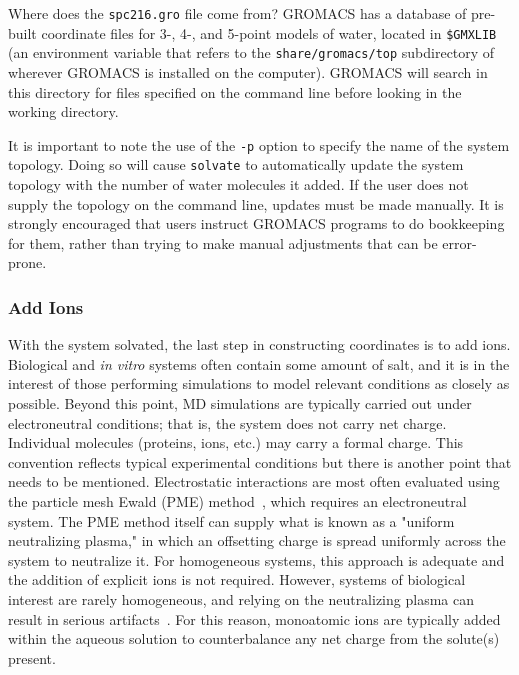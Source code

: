 \documentclass[9pt,tutorial]{livecoms}
\begin{document}
Where does the \texttt{spc216.gro} file come from? GROMACS has a database of pre-built coordinate files for 3-, 4-, and 5-point models of water, located in \texttt{\$GMXLIB} (an environment variable that refers to the \texttt{share/gromacs/top} subdirectory of wherever GROMACS is installed on the computer). GROMACS will search in this directory for files specified on the command line before looking in the working directory.

It is important to note the use of the \texttt{-p} option to specify the name of the system topology. Doing so will cause \texttt{solvate} to automatically update the system topology with the number of water molecules it added. If the user does not supply the topology on the command line, updates must be made manually. It is strongly encouraged that users instruct GROMACS programs to do bookkeeping for them, rather than trying to make manual adjustments that can be error-prone.

\subsubsection{Add Ions} \label{lyso_ions}

With the system solvated, the last step in constructing coordinates is to add ions. Biological and {\em in vitro} systems often contain some amount of salt, and it is in the interest of those performing simulations to model relevant conditions as closely as possible. Beyond this point, MD simulations are typically carried out under electroneutral conditions; that is, the system does not carry net charge. Individual molecules (proteins, ions, etc.) may carry a formal charge. This convention reflects typical experimental conditions but there is another point that needs to be mentioned. Electrostatic interactions are most often evaluated using the particle mesh Ewald (PME) method~\cite{Darden1993,Essmann1995}, which requires an electroneutral system. The PME method itself can supply what is known as a "uniform neutralizing plasma," in which an offsetting charge is spread uniformly across the system to neutralize it. For homogeneous systems, this approach is adequate and the addition of explicit ions is not required. However, systems of biological interest are rarely homogeneous, and relying on the neutralizing plasma can result in serious artifacts~\cite{Hub2014}. For this reason, monoatomic ions are typically added within the aqueous solution to counterbalance any net charge from the solute(s) present.
\end{document}
